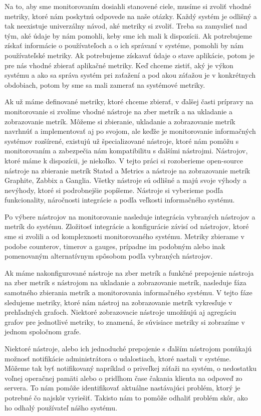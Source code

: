 \documentclass[a4paper, usesections, upjsfrontpage, thesismargins, thesislinespacing, twoside]{rnthesissvk}
\begin{document}
Na to, aby sme monitorovaním dosiahli stanovené ciele, musíme si zvoliť vhodné metriky, 
	ktoré nám poskytnú odpovede na naše otázky.
Každý systém je odlišný a tak neexistuje univerzálny návod, aké metriky si zvoliť.
Treba sa zamyslieť nad tým, aké údaje by nám pomohli, keby sme ich mali k dispozícii.
Ak potrebujeme získať informácie o používateľoch a o ich správaní v systéme, pomohli by nám používateľské metriky.
Ak potrebujeme získavať údaje o stave aplikácie, potom je pre nás vhodné zbierať aplikačné metriky.
Keď chceme zistiť, aký je výkon systému a ako sa správa systém pri zaťažení a pod akou záťažou je v konkrétnych obdobiach, potom by sme sa mali zamerať na systémové metriky.

Ak už máme definované metriky, ktoré chceme zbierať, v ďalšej časti prípravy na monitorovanie si zvolíme vhodné nástroje na zber 	metrík a na ukladanie a zobrazovanie metrík.
Môžeme si zbieranie, ukladanie a zobrazovanie metrík navrhnúť a implementovať aj po svojom, ale keďže je monitorovanie informačných systémov rozšírené, existujú už špecializované nástroje, ktoré nám pomôžu s monitorovaním a zabezpečia nám kompatibilitu s ďalšími nástrojmi.
Nástrojov, ktoré máme k dispozícii, je niekoľko.
V tejto práci si rozoberieme open-source nástroje na zbieranie metrík Statsd a Metrics a nástroje na zobrazovanie metrík Graphite, Zabbix a Ganglia.
Všetky nástroje sú odlišné a majú svoje výhody a nevýhody, ktoré si podrobnejšie popíšeme.
Nástroje si vyberieme podľa funkcionality, náročnosti integrácie a podľa veľkosti informačného systému.

Po výbere nástrojov na monitorovanie nasleduje integrácia vybraných nástrojov a metrík do systému.
Zložitosť integrácie a konfigurácie závisí od nástrojov, ktoré sme si zvolili a od komplexnosti monitorovaného systému.
Metriky zbierame v podobe counterov, timerov a gauges, prípadne im podobným alebo inak pomenovaným alternatívnym spôsobom podľa vybraných nástrojov.

Ak máme nakonfigurované nástroje na zber metrík a funkčné prepojenie nástroja na zber metrík s nástrojom na ukladanie a zobrazovanie metrík, nasleduje fáza samotného zbierania metrík a monitorovania informačného systému.
V tejto fáze sledujeme metriky, ktoré nám nástroj na zobrazovanie metrík vykresľuje v prehľadných grafoch.
Niektoré zobrazovacie nástroje umožňujú aj agregáciu grafov pre jednotlivé metriky, to znamená, že súvisiace metriky si zobrazíme v jednom spoločnom grafe. 

Niektoré nástroje, alebo ich jednoduché prepojenie s ďalším nástrojom ponúkajú možnosť notifikácie administrátora o udalostiach, ktoré nastali v systéme.
Môžeme tak byť notifikovaný napríklad o priveľkej záťaži na systém, o nedostatku voľnej operačnej pamäti alebo o pridlhom čase čakania klienta na odpoveď zo servera.
To nám pomôže identifikovať aktuálne nastávajúci problém, ktorý je potrebné čo najskôr vyriešiť.
Takisto nám to pomôže odhaliť problém skôr, ako ho odhalý používateľ nášho systému.
\end{document}
